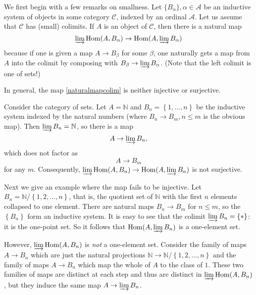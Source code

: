 We first begin with a few remarks on smallness.
Let $\{B_{\alpha}\}, \alpha \in \mathcal{A}$ be an inductive system of objects in some
category $\mathcal{C}$, indexed by
an ordinal $\mathcal{A}$. Let us assume that $\mathcal{C}$ has (small)
colimits. If $A$ is an object of $\mathcal{C}$, then there is a
natural map
\begin{equation} \label{naturalmapcolim} \varinjlim \hom(A, B_\alpha) \to
\hom(A, \varinjlim B_\alpha)  \end{equation}
because if one is given a map $A \to B_\beta$ for some $\beta$, one
naturally gets a map from $A$  into the colimit by composing with $B_\beta
\to \varinjlim B_\alpha$. (Note that the left colimit is one of sets!)


In general, the map \cref{naturalmapcolim} is neither injective or surjective.

\begin{example} 
Consider the category of sets. Let $A = \mathbb{N}$ and $B_n = \left\{1,
\dots, n\right\}$ be the inductive system indexed by the natural numbers
(where $B_n \to B_{m}, n \leq m$ is the obvious map). Then $\varinjlim B_n =
\mathbb{N}$, so there is a map
\[ A \to \varinjlim B_n,  \]
which does not factor as 
\[ A \to B_m  \]
for any $m$. Consequently, $\varinjlim \hom(A, B_n) \to \hom(A, \varinjlim
B_n)$ is not surjective.
\end{example} 

\begin{example} 
Next we give an example where the map fails to be injective. Let $B_n =
\mathbb{N}/\left\{1,  2, \dots, n\right\}$, that is, the quotient set of
$\mathbb{N}$ with the first $n$ elements collapsed to one element.
There are natural maps $B_n \to B_m$ for $n \leq m$, so the
$\left\{B_n\right\}$ form an inductive system. It is easy to see that the
colimit $\varinjlim B_n = \left\{\ast \right\}$: it is the one-point set.
So it follows that $\hom(A, \varinjlim B_n)$ is a one-element set.

However, $\varinjlim \hom(A , B_n)$ is \emph{not} a one-element set. 
Consider the family of maps $A \to B_n$ which are just the natural projections
$\mathbb{N} \to \mathbb{N}/\left\{1, 2, \dots, n\right\}$ and the family of
maps $A \to B_n$ which map the whole of $A$ to the class of $1$.
These two families of maps are distinct at each step and thus are distinct in
$\varinjlim \hom(A, B_n)$, but they induce the same map $A \to \varinjlim B_n$.
\end{example} 


